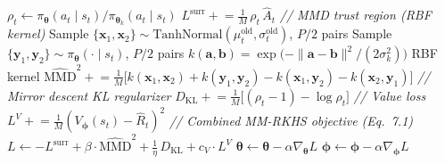 \documentclass[11pt]{article}
\begin{document}
\begin{algorithm}[p]
\begin{minipage}[t]{0.68\linewidth}
\begin{algorithmic}[1]
                \State $\rho_t \gets \pi_{\boldsymbol{\theta}}(a_t \mid s_t) / \pi_{\boldsymbol{\theta}_k}(a_t \mid s_t)$
                \State $L^{\text{surr}} \mathrel{+}= \frac{1}{M}\, \rho_t\, \hat{A}_t$
                \Statex \hspace{\algorithmicindent}\hspace{\algorithmicindent}\hspace{\algorithmicindent}\hspace{\algorithmicindent}\textit{// MMD trust region (RBF kernel)}
                \State Sample $\{\mathbf{x}_1, \mathbf{x}_2\} \sim \text{TanhNormal}(\mu_t^{\text{old}}, \sigma_t^{\text{old}})$, \; $P/2$ pairs
                \State Sample $\{\mathbf{y}_1, \mathbf{y}_2\} \sim \pi_{\boldsymbol{\theta}}(\cdot \mid s_t)$, \; $P/2$ pairs
                \State $k(\mathbf{a}, \mathbf{b}) = \exp\!\big({-}\|\mathbf{a} - \mathbf{b}\|^2 / (2\sigma_k^2)\big)$ \hfill RBF kernel
                \State $\widehat{\text{MMD}}^2 \mathrel{+}= \frac{1}{M}\big[k(\mathbf{x}_1, \mathbf{x}_2) {+} k(\mathbf{y}_1, \mathbf{y}_2) {-} k(\mathbf{x}_1, \mathbf{y}_2) {-} k(\mathbf{x}_2, \mathbf{y}_1)\big]$
                \Statex \hspace{\algorithmicindent}\hspace{\algorithmicindent}\hspace{\algorithmicindent}\hspace{\algorithmicindent}\textit{// Mirror descent KL regularizer}
                \State $D_{\text{KL}} \mathrel{+}= \frac{1}{M}\big[(\rho_t - 1) - \log \rho_t\big]$
                \Statex \hspace{\algorithmicindent}\hspace{\algorithmicindent}\hspace{\algorithmicindent}\hspace{\algorithmicindent}\textit{// Value loss}
                \State $L^V \mathrel{+}= \frac{1}{M}(V_{\boldsymbol{\phi}}(s_t) - \hat{R}_t)^2$
            \EndFor
            \Statex \hspace{\algorithmicindent}\hspace{\algorithmicindent}\hspace{\algorithmicindent}\textit{// Combined MM-RKHS objective (Eq.\ 7.1)}
            \State $L \gets -L^{\text{surr}} + \beta \cdot \widehat{\text{MMD}}^2 + \tfrac{1}{\eta}\, D_{\text{KL}} + c_V \cdot L^V$
            \State $\boldsymbol{\theta} \gets \boldsymbol{\theta} - \alpha \nabla_{\boldsymbol{\theta}} L$
            \State $\boldsymbol{\phi} \gets \boldsymbol{\phi} - \alpha \nabla_{\boldsymbol{\phi}} L$
        \EndFor
    \EndFor
\EndFor
\end{algorithmic}
\end{minipage}
\end{algorithm}
\end{document}
